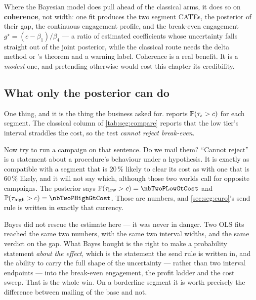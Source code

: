 Where the Bayesian model does pull ahead of the classical arms, it does so on \textbf{coherence},
not width: one fit produces the two segment CATEs, the posterior of their gap, the continuous
engagement profile, and the break-even engagement $g^\star = (c - \beta_1)/\beta_4$ --- a ratio of
estimated coefficients whose uncertainty falls straight out of the joint posterior, while the
classical route needs the delta method or \citeauthor{fieller1954}'s theorem \citep{fieller1954} and
a warning label. Coherence is a real benefit. It is a \emph{modest} one, and pretending otherwise
would cost this chapter its credibility.

\subsection*{What only the posterior can do}

One thing, and it is the thing the business asked for.  reports
$\operatorname{\mathbb{P}}(\tau_s > c)$ for each segment. The classical column of \cref{tab:seg:compare} reports that
the low tier's interval straddles the \eur{\nbTwoCost} cost, so the test \emph{cannot reject
break-even}.

Now try to run a campaign on that sentence. Do we mail them? ``Cannot reject'' is a statement about
a procedure's behaviour under a hypothesis. It is exactly as compatible with a segment that is
20\,\% likely to clear its cost as with one that is 60\,\% likely, and it will not say which,
although those two worlds call for opposite campaigns. The posterior says
$\Prob(\tau_{\mathrm{low}} > c) = \nbTwoPLowGtCost$ and
$\Prob(\tau_{\mathrm{high}} > c) = \nbTwoPHighGtCost$. Those are numbers, and
\cref{sec:seg:euro}'s send rule is written in exactly that currency.

\begin{remark}
Bayes did not rescue the estimate here --- it was never in danger. Two OLS fits reached the same two
numbers, with the same two interval widths, and the same verdict on the gap. What Bayes bought is
the right to make a probability statement \emph{about the effect}, which is the statement the send
rule is written in, and the ability to carry the full shape of the uncertainty --- rather than two
interval endpoints --- into the break-even engagement, the profit ladder and the cost sweep. That is
the whole win. On a borderline segment it is worth precisely the difference between mailing
\pc{\nbTwoShareLow} of the base and not.
\end{remark}

